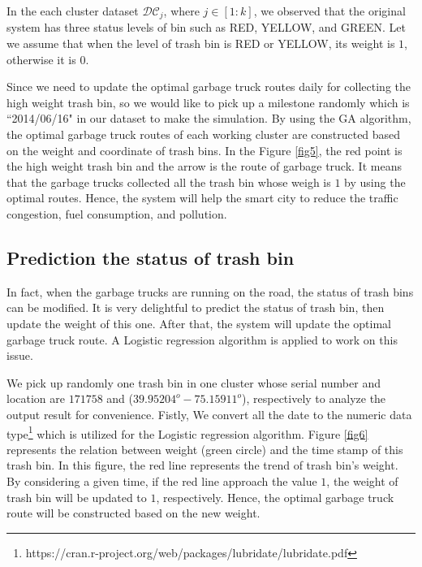 \documentclass[conference]{IEEEtran}
\begin{document}
In the each cluster dataset $\mathcal{DC}_j$, where $j \in [1:k]$, we observed that the original system has three status levels of bin such as RED, YELLOW, and GREEN. Let we assume that when the level of trash bin is RED or YELLOW, its weight is $1$, otherwise it is $0$.

\par Since we need to update the optimal garbage truck routes daily for collecting the high weight trash bin, so we would like to pick up a milestone randomly which is ``2014/06/16" in our dataset to make the simulation. By using the GA algorithm, the optimal garbage truck routes of each working cluster are constructed based on the weight and coordinate of trash bins. In the Figure \ref{fig5}, the red point is the high weight trash bin and the arrow is the route of garbage truck. It means that the garbage trucks collected all the trash bin whose weigh is $1$ by using the optimal routes. Hence, the system will help the smart city to reduce the traffic congestion, fuel consumption, and pollution.




\subsection{Prediction the status of trash bin} 

In fact, when the garbage trucks are running on the road, the status of trash bins can be modified. It is very delightful to predict the status of trash bin, then update the weight of this one. After that, the system will update the optimal garbage truck route. A Logistic regression algorithm is applied to work on this issue. 

We pick up randomly one trash bin in one cluster whose serial number and location are $171758$ and ($39.95204^o -75.15911^o$), respectively to analyze the output result for convenience. Fistly, We convert all the date to the numeric data type\footnote{https://cran.r-project.org/web/packages/lubridate/lubridate.pdf} which is utilized for the Logistic regression algorithm. Figure \ref{fig6} represents the relation between weight (green circle) and the time stamp of this trash bin. In this figure, the red line represents the trend of trash bin's weight. By considering a given time, if the red line approach the value $1$, the weight of trash bin will be updated to $1$, respectively. Hence, the optimal garbage truck route will be constructed based on the new weight.
\end{document}
